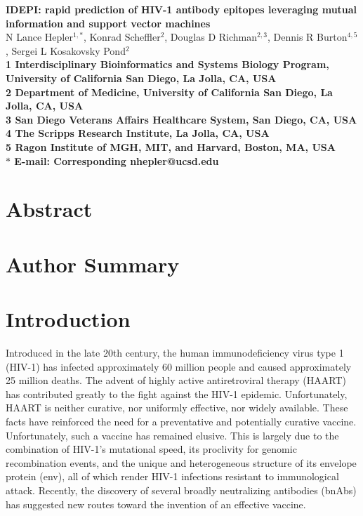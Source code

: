 \documentclass[10pt]{article}
\date{}
\newcommand{\idepi}{{IDEPI}}
\begin{document}
\begin{flushleft}
{\Large
\textbf{\idepi: rapid prediction of HIV-1 antibody epitopes leveraging mutual information and support vector machines}
}
\\
N Lance Hepler$^{1,\ast}$,
Konrad Scheffler$^{2}$,
Douglas D Richman$^{2,3}$,
Dennis R Burton$^{4,5}$,
Sergei L Kosakovsky Pond$^{2}$
\\
\bf{1} Interdisciplinary Bioinformatics and Systems Biology Program, University of California San Diego, La Jolla, CA, USA
\\
\bf{2} Department of Medicine, University of California San Diego, La Jolla, CA, USA
\\
\bf{3} San Diego Veterans Affairs Healthcare System, San Diego, CA, USA
\\
\bf{4} The Scripps Research Institute, La Jolla, CA, USA
\\
\bf{5} Ragon Institute of {MGH}, {MIT}, and Harvard, Boston, MA, USA
\\
$\ast$ E-mail: Corresponding nhepler@ucsd.edu
\end{flushleft}

\section*{Abstract}

\section*{Author Summary}

\section*{Introduction}
Introduced in the late 20th century,
the human immunodeficiency virus type 1 (HIV-1) has infected approximately 60 million people
and caused approximately 25 million deaths.
The advent of highly active antiretroviral therapy ({HAART}) has contributed greatly to the fight against the HIV-1 epidemic.
Unfortunately, HAART is neither curative, nor uniformly effective, nor widely available.
These facts have reinforced the need for a preventative and potentially curative vaccine.
Unfortunately, such a vaccine has remained elusive.
This is largely due to the combination of HIV-1's mutational speed,
its proclivity for genomic recombination events,
and the unique and heterogeneous structure of its envelope protein (env),
all of which render HIV-1 infections resistant to immunological attack.
Recently, the discovery of several broadly neutralizing antibodies (bnAbs) has suggested new routes toward the invention of an effective vaccine.
\end{document}
